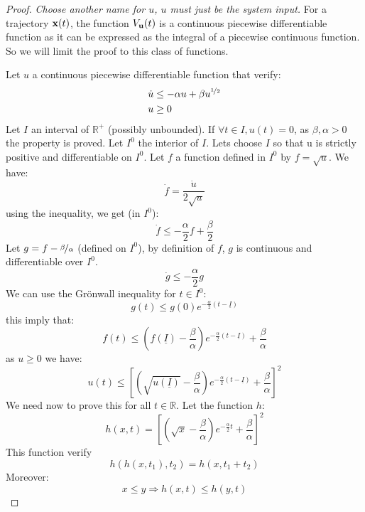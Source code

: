 \begin{proof}
\newcommand{\tI}{\underline{I}}
\newcommand{\tIs}{\overline{I}}
\textit{Choose another name for $u$, $u$ must just be the system input.}
For a trajectory $ \mathbf{x}(t)$, the function $V_{ \mathbf{u}}(t)$ is a continuous piecewise differentiable function as it can be expressed as the integral of a piecewise continuous function.
So we will limit the proof to this class of functions.

Let $u$ a continuous piecewise differentiable function that verify:
\begin{align*}
\dot{u} &\leq -\alpha u + \beta u^{\nicefrac{1}{2}}\\
u & \geq 0
\end{align*}
Let $I$ an interval of $\mathbb{R}^+$ (possibly unbounded).
If $\forall t\in I, u(t)=0$, as $\beta,\alpha>0$ the property is proved.
Let $I^0$ the interior of $I$.
Lets choose $I$ so that u is strictly positive and differentiable on $I^0$.
Let $f$ a function defined in $I^0$ by $f = \sqrt{u}$.
We have:
$$\dot{f} = \frac{\dot{u}}{2\sqrt{u}}$$
using the inequality, we get (in $I^0$):
$$\dot{f} \leq -\frac{\alpha}{2} f + \frac{\beta}{2}$$
Let $g = f- \nicefrac{\beta}{\alpha}$ (defined on $I^0$), 
by definition of $f$, $g$ is continuous and differentiable over $I^0$.
$$\dot{g} \leq -\frac{\alpha}{2} g$$
We can use the Gr\"onwall inequality for $t \in I^0$:
$$g(t) \leq g(0) e^{-\frac{\alpha}{2} (t-\tI)}$$
this imply that:
$$f(t) \leq (f(\tI)- \frac{\beta}{\alpha}) e^{-\frac{\alpha}{2} (t-\tI)} + \frac{\beta}{\alpha}$$
as $u \geq 0$ we have:
$$ u(t) \leq  \left[ (\sqrt{u(\tI)} - \frac{\beta}{\alpha}) e^{-\frac{\alpha}{2} (t-\tI)} + \frac{\beta}{\alpha} \right] ^2$$
We need now to prove this for all $t \in \mathbb{R}$.
Let the function $h$:
$$h(x,t) = \left[ (\sqrt{x} - \frac{\beta}{\alpha}) e^{-\frac{\alpha}{2}t} + \frac{\beta}{\alpha} \right] ^2$$
This function verify
\begin{equation} \label{eq:h_compo}
h(h(x,t_1),t_2) = h(x,t_1+t_2)
\end{equation}
Moreover:
\begin{equation} \label{eq:h_monot}
x \leq y \Rightarrow h(x,t) \leq h(y,t)
\end{equation}


\end{proof}
